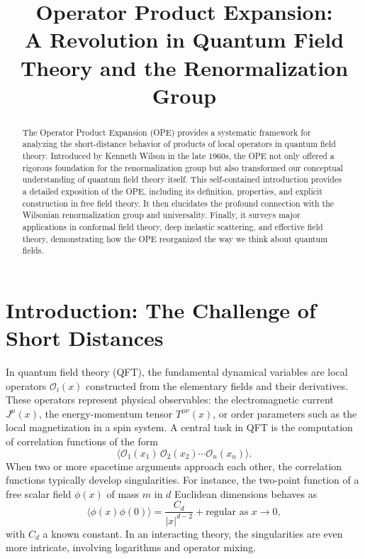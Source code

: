\documentclass[11pt]{article}
\title{Operator Product Expansion:\\ A Revolution in Quantum Field Theory and the Renormalization Group}
\author{}
\date{}
\begin{document}
\maketitle

\begin{abstract}
The Operator Product Expansion (OPE) provides a systematic framework for analyzing the short-distance behavior of products of local operators in quantum field theory. Introduced by Kenneth Wilson in the late 1960s, the OPE not only offered a rigorous foundation for the renormalization group but also transformed our conceptual understanding of quantum field theory itself. This self-contained introduction provides a detailed exposition of the OPE, including its definition, properties, and explicit construction in free field theory. It then elucidates the profound connection with the Wilsonian renormalization group and universality. Finally, it surveys major applications in conformal field theory, deep inelastic scattering, and effective field theory, demonstrating how the OPE reorganized the way we think about quantum fields.
\end{abstract}


\section{Introduction: The Challenge of Short Distances}
\label{sec:intro}

In quantum field theory (QFT), the fundamental dynamical variables are local operators $\mathcal{O}_i(x)$ constructed from the elementary fields and their derivatives. These operators represent physical observables: the electromagnetic current $J^\mu(x)$, the energy-momentum tensor $T^{\mu\nu}(x)$, or order parameters such as the local magnetization in a spin system. A central task in QFT is the computation of correlation functions of the form
\begin{equation}
\label{eq:correl}
\langle \mathcal{O}_1(x_1) \, \mathcal{O}_2(x_2) \cdots \mathcal{O}_n(x_n) \rangle .
\end{equation}
When two or more spacetime arguments approach each other, the correlation functions typically develop singularities. For instance, the two-point function of a free scalar field $\phi(x)$ of mass $m$ in $d$ Euclidean dimensions behaves as
\[
\langle \phi(x) \phi(0) \rangle = \frac{C_d}{|x|^{d-2}} + \text{regular as } x \to 0,
\]
with $C_d$ a known constant. In an interacting theory, the singularities are even more intricate, involving logarithms and operator mixing.
\end{document}
